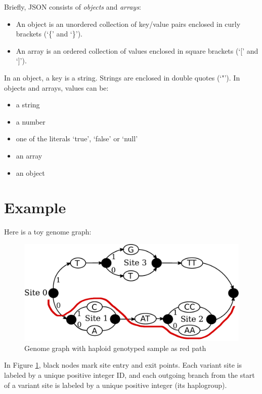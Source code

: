 Briefly, JSON consists of \emph{objects} and \emph{arrays}:

\begin{itemize}
\tightlist
\item
  An object is an unordered collection of key/value pairs enclosed in
  curly brackets (`\{' and `\}').
\item
  An array is an ordered collection of values enclosed in square
  brackets (`{[}' and `{]}').
\end{itemize}

In an object, a key is a string. Strings are enclosed in double quotes
(`"'). In objects and arrays, values can be:

\begin{itemize}
\tightlist
\item
  a string
\item
  a number
\item
  one of the literals `true', `false' or `null'
\item
  an array
\item
  an object
\end{itemize}

\newpage

\hypertarget{example}{%
\section{Example}\label{example}}

Here is a toy genome graph:

\begin{figure}
\centering
\includegraphics{img/example_graph.pdf}
\caption{Genome graph with haploid genotyped sample as red path
\label{toy_graph}}
\end{figure}

In Figure \ref{toy_graph}, black nodes mark site entry and exit points.
Each variant site is labeled by a unique positive integer ID, and each
outgoing branch from the start of a variant site is labeled by a unique
positive integer (its haplogroup).


